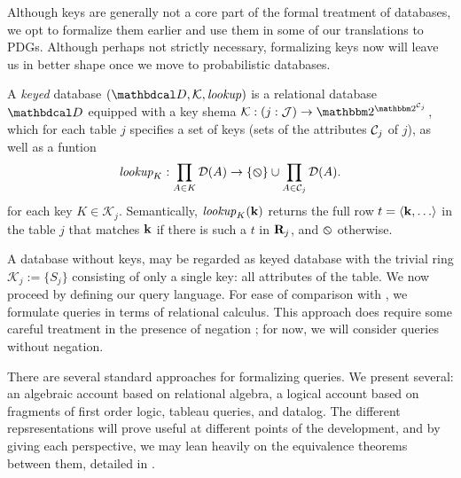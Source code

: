 \documentclass[the-pdg-manual.tex]{subfiles}
\begin{document}
Although keys are generally not a core part of the formal treatment of databases, we opt to formalize them earlier and use them in some of our translations to PDGs. Although perhaps not strictly necessary, formalizing keys now will leave us in better shape once we move to probabilistic databases. 

\begin{defn}
	A \emph{keyed} database $(\D, \mathcal K, \mathit{lookup})$ is a relational database $\D$ %
	equipped with a key shema $\mathcal K : (j:\Idx) \to \two^{\two^{\Cols_j}}$, which for each table $j$ specifies a set of keys (sets of the attributes $\mathcal C_j$ of $j$), as well as a funtion 
	$$\textit{lookup}_K : \prod_{A \in K}{\mathcal D}(A) \to \{\varobslash\} \cup \prod_{A \in \mathcal C_j}{\mathcal D}(A).$$
	for each key $K \in \mathcal K_j$. Semantically, $\mathit{lookup}_K(\mathbf k)$ returns the full row $t = \langle \mathbf k, \ldots \rangle$ in the table $j$ that matches $\mathbf k$ if there is such a $t$ in ${\mathbf R}_j$, and $\varobslash$ otherwise.
\end{defn}

A database without keys, may be regarded as keyed database with the trivial ring $\mathcal K_j := \{ S_j \}$ consisting of only a single key: all attributes of the table.
We now proceed by defining our query language. For ease of comparison with \cite{suciu2011probabilistic}, we formulate queries in terms of relational calculus. This approach does require some careful treatment in the presence of negation \cite[Chapter 5]{abiteboul1995foundations}; for now, we will consider queries without negation.

There are several standard approaches for formalizing queries. We present several: an algebraic account based on relational algebra, a logical account based on fragments of first order logic, tableau queries, and datalog. The different repsresentations will prove useful at different points of the development, and by giving each perspective, we may lean heavily on the equivalence theorems between them, detailed  in \cite{abiteboul1995foundations}.
\end{document}
